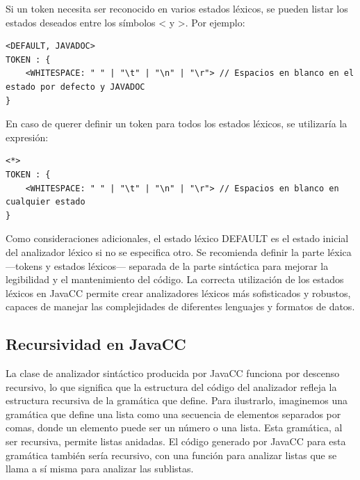 Si un token necesita ser reconocido en varios estados léxicos, se pueden listar los estados deseados entre los símbolos < y >. Por ejemplo:

\lstset{inputencoding=utf8/latin1}
\begin{lstlisting}
<DEFAULT, JAVADOC>
TOKEN : {
	<WHITESPACE: " " | "\t" | "\n" | "\r"> // Espacios en blanco en el estado por defecto y JAVADOC
}
\end{lstlisting}

En caso de querer definir un token para todos los estados léxicos, se utilizaría la expresión:

\lstset{inputencoding=utf8/latin1}
\begin{lstlisting}
<*>
TOKEN : {
	<WHITESPACE: " " | "\t" | "\n" | "\r"> // Espacios en blanco en cualquier estado
}
\end{lstlisting}

Como consideraciones adicionales, el estado léxico DEFAULT es el estado inicial del analizador léxico si no se especifica otro.
Se recomienda definir la parte léxica ---tokens y estados léxicos--- separada de la parte sintáctica para mejorar la legibilidad y el mantenimiento del código.
La correcta utilización de los estados léxicos en JavaCC permite crear analizadores léxicos más sofisticados y robustos, capaces de manejar las complejidades de diferentes lenguajes y formatos de datos.

\subsection{Recursividad en JavaCC}



\noindent La clase de analizador sintáctico producida por JavaCC funciona por descenso recursivo, lo que significa que la estructura del código del analizador refleja la estructura recursiva de la gramática que define. Para ilustrarlo, imaginemos una gramática que define una lista como una secuencia de elementos separados por comas, donde un elemento puede ser un número o una lista. Esta gramática, al ser recursiva, permite listas anidadas. El código generado por JavaCC para esta gramática también sería recursivo, con una función para analizar listas que se llama a sí misma para analizar las sublistas.


